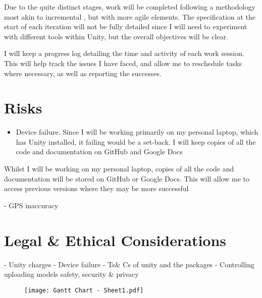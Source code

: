 \documentclass{article}
\begin{document}
Due to the quite distinct stages, work will be completed following a methodology most akin to incremental \cite{agile}, but with more agile elements. The specification at the start of each iteration will not be fully detailed since I will need to experiment with different tools within Unity, but the overall objectives will be clear. 

I will keep a progress log detailing the time and activity of each work session. This will help track the issues I have faced, and allow me to reschedule tasks where necessary, as well as reporting the successes. 

\section{Risks}
\begin{itemize}
    \item Device failure. 
    Since I will be working primarily on my personal laptop, which has Unity installed, it failing would be a set-back. I will keep copies of all the code and documentation on GitHub and Google Docs 
\end{itemize}
Whilst I will be working on my personal laptop, copies of all the code and documentation will be stored on GitHub or Google Docs. This will allow me to access previous versions where they may be more successful

- GPS inaccuracy

\section{Legal \& Ethical Considerations}
- Unity charges
- Device failure
- Ts\& Cs of unity and the packages
- Controlling uploading models safety, security \& privacy


\begin{figure}
    \texttt{[image: Gantt Chart - Sheet1.pdf]}
        \label{fig:gantt}
\end{figure}

\newpage

\end{document}
